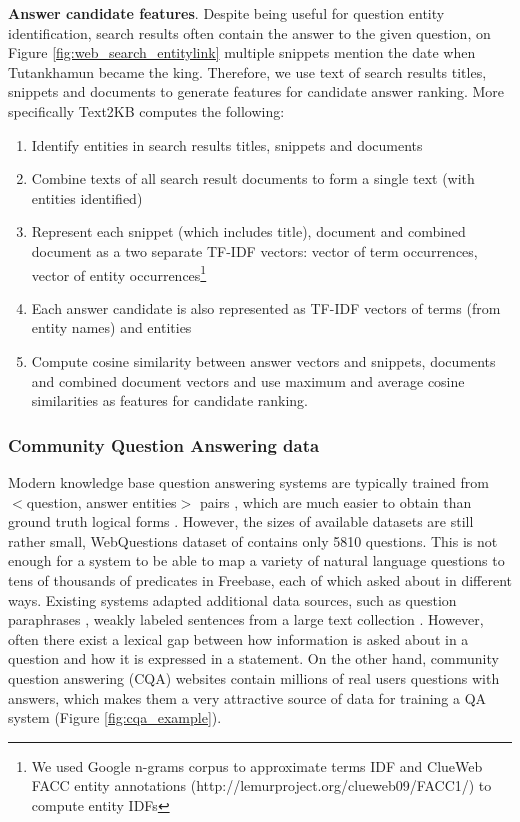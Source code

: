 \textbf{Answer candidate features}.
Despite being useful for question entity identification, search results often contain the answer to the given question, \eg on Figure \ref{fig:web_search_entitylink} multiple snippets mention the date when Tutankhamun became the king.
Therefore, we use text of search results titles, snippets and documents to generate features for candidate answer ranking.
More specifically Text2KB computes the following:
\begin{enumerate}
\item Identify entities in search results titles, snippets and documents
\item Combine texts of all search result documents to form a single text (with entities identified)
\item Represent each snippet (which includes title), document and combined document as a two separate TF-IDF vectors: vector of term occurrences, vector of entity occurrences\footnote{We used Google n-grams corpus to approximate terms IDF and ClueWeb FACC entity annotations (http://lemurproject.org/clueweb09/FACC1/) to compute entity IDFs}
\item Each answer candidate is also represented as TF-IDF vectors of terms (from entity names) and entities
\item Compute cosine similarity between answer vectors and snippets, documents and combined document vectors and use maximum and average cosine similarities as features for candidate ranking.
\end{enumerate}

\subsubsection{Community Question Answering data}

Modern knowledge base question answering systems are typically trained from $<$question, answer entities$>$ pairs \cite{Berant:EMNLP13}, which are much easier to obtain than ground truth logical forms \cite{cai2013large}.
However, the sizes of available datasets are still rather small, \ie WebQuestions dataset of \cite{Berant:EMNLP13} contains only 5810 questions.
This is not enough for a system to be able to map a variety of natural language questions to tens of thousands of predicates in Freebase, each of which asked about in different ways.
Existing systems adapted additional data sources, such as question paraphrases \cite{berant2014semantic}, weakly labeled sentences from a large text collection \cite{yao2014information}.
However, often there exist a lexical gap between how information is asked about in a question and how it is expressed in a statement.
On the other hand, community question answering (CQA) websites contain millions of real users questions with answers, which makes them a very attractive source of data for training a QA system (\eg Figure \ref{fig:cqa_example}).

